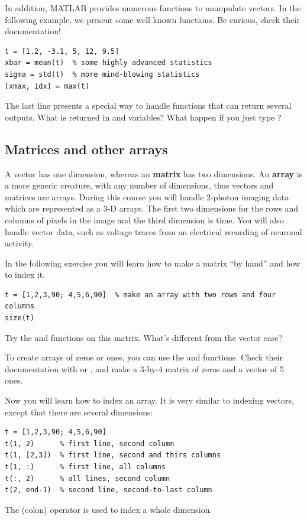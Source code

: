 \documentclass{article}
\begin{document}
In addition,  MATLAB provides numerous functions to manipulate vectors.
In the following example, we present some well known functions.
Be curious, check their documentation!
\begin{lstlisting}
t = [1.2, -3.1, 5, 12, 9.5]
xbar = mean(t)  % some highly advanced statistics
sigma = std(t)  % more mind-blowing statistics
[xmax, idx] = max(t)
\end{lstlisting}
The last line presents a special way to handle functions that can return several outputs.
What is returned in  and  variables?
What happen if you just type ?


\subsection{Matrices and other arrays}

A vector has one dimension, whereas an \textbf{matrix} has two dimensions.
An \textbf{array} is a more generic creature, with any number of dimensions, thus vectors and matrices are arrays.
During this course you will handle 2-photon imaging data which are represented as a 3-D arrays.
The first two dimensions for the rows and columns of pixels in the image and the third dimension is time.
You will also handle vector data, such as voltage traces from an electrical recording of neuronal activity.

In the following exercise you will learn how to make a matrix ``by hand'' and how to index it.
\begin{lstlisting}
t = [1,2,3,90; 4,5,6,90]  % make an array with two rows and four columns
size(t)
\end{lstlisting}

Try the  and  functions on this matrix.
What's different from the vector case?

To create arrays of zeros or ones, you can use the  and  functions.
Check their documentation with  or , and make a 3-by-4 matrix of zeros and a vector of 5 ones.

Now you will learn how to index an array.
It is very similar to indexing vectors, except that there are several dimensions:
\begin{lstlisting}
t = [1,2,3,90; 4,5,6,90]
t(1, 2)      % first line, second column
t(1, [2,3])  % first line, second and thirs columns
t(1, :)      % first line, all columns
t(:, 2)      % all lines, second column
t(2, end-1)  % second line, second-to-last column
\end{lstlisting}
The \mcode{:} (colon) operator is used to index a whole dimension.
\end{document}
